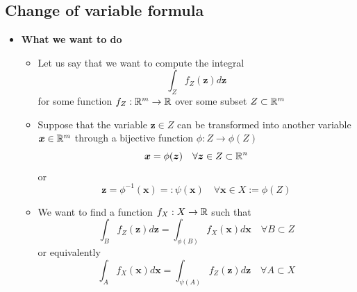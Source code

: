 \documentclass[12pt,a4paper]{article}
\begin{document}
\subsection{Change of variable formula}

\begin{itemize}
\item \textbf{What we want to do}
  \begin{itemize}
  \item Let us say that
    we want to compute the integral
    \begin{equation}\nonumber%
      \int_{Z}f_{Z}(\bm{z})d\bm{z}
    \end{equation}
    for some function $f_{Z}:\mathbb{R}^{m}\to \mathbb{R}$
    over some subset $Z\subset \mathbb{R}^{m}$
  \item Suppose that the variable $\bm{z}\in Z$ can be transformed into another variable $\bm{x}\in \mathbb{R}^{m}$
    through a bijective function $\phi:Z\to \phi(Z)$
    \begin{equation}\nonumber%
      \bm{x} = \phi(\bm{z}) \quad \forall \bm{z}\in Z\subset \R^{n}
    \end{equation}
    or
    \begin{equation}\nonumber%
      \bm{z} = \phi^{-1}(\bm{x})=:\psi(\bm{x}) \quad \forall \bm{x}\in X:=\phi(Z)
    \end{equation}
  \item We want to find a function $f_{X}:X\to\mathbb{R}$ such that
    \begin{equation}\label{eq:fzfx}%
      \int_{B}f_{Z}(\bm{z})d\bm{z}
      = \int_{\phi(B)}f_{X}(\bm{x})d\bm{x}
      \quad \forall B\subset Z
    \end{equation}
    or equivalently 
    \begin{equation}\label{eq:fxfz}%
      \int_{A}f_{X}(\bm{x})d\bm{x} = \int_{\psi(A)}f_{Z}(\bm{z})d\bm{z} \quad \forall A\subset X
    \end{equation}
  \end{itemize}


\end{itemize}
\end{document}
